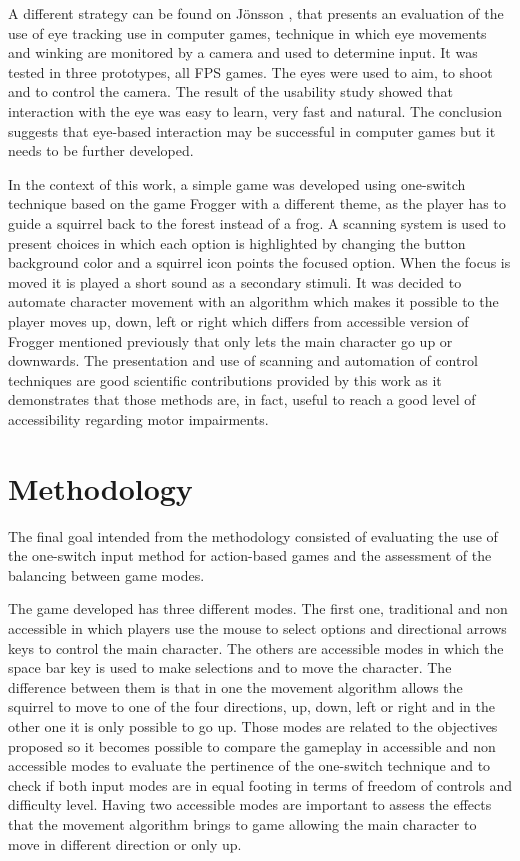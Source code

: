 \documentclass[a4paper]{sbgames}               %
\begin{document}
A different strategy can be found on J{\"o}nsson , that presents an evaluation of the use of eye tracking use in computer games, technique in which eye movements and winking are monitored by a camera and used to determine input. It was tested in three prototypes, all FPS games. The eyes were used to aim, to shoot and to control the camera. The result of the usability study showed that interaction with the eye was easy to learn, very fast and natural. The conclusion suggests that eye-based interaction may be successful in computer games but it needs to be further developed.

In the context of this work, a simple game was developed  using one-switch technique based on the game Frogger  with a different theme, as the player has to guide a squirrel back to the forest instead of a frog. A scanning system is used to present choices in which each option is highlighted by changing the button background color and a squirrel icon points the focused option. When the focus is moved it is played a short sound as a secondary stimuli. It was decided to automate character movement with an algorithm which makes it possible to the player moves up, down, left or right which differs from accessible version of Frogger mentioned previously that only lets the main character go up or downwards. The presentation and use of scanning and automation of control techniques are good scientific contributions provided by this work as it demonstrates that those methods are, in fact, useful to reach a good level of accessibility regarding motor impairments.

\section{Methodology}
\label{sec:methodology}

The final goal intended from the methodology consisted of evaluating the use of the one-switch input method for action-based games and the assessment of the balancing between game modes.

The game developed has three different modes. The first one, traditional and non accessible in which players use the mouse to select options and directional arrows keys to control the main character. The others are accessible modes in which the space bar key is used to make selections and to move the character. The difference between them is that in one the movement algorithm allows the squirrel to move to one of the four directions, up, down, left or right and in the other one it is only possible to go up. Those modes are related to the objectives proposed so it becomes possible to compare the gameplay in accessible and non accessible modes to evaluate the pertinence of the one-switch technique and to check if both input modes are in equal footing in terms of freedom of controls and difficulty level. Having two accessible modes are important to assess the effects that the movement algorithm brings to game allowing the main character to move in different direction or only up.
\end{document}
